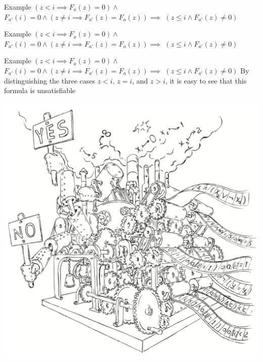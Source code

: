 \documentclass{beamer}
\begin{document}
\begin{frame}{Example}
$(z < i \implies F_a(z) = 0) \wedge$\newline
$F_{a'}(i) = 0 \wedge (z \ne i \implies F_{a'}(z) = F_a(z))\implies$\newline
$(z \le i \wedge F_{a'}(z) \ne 0)$
\end{frame}

\begin{frame}{Example}
$(z < i \implies F_a(z) = 0) \wedge$\newline
$F_{a'}(i) = 0 \wedge (z \ne i \implies F_{a'}(z) = F_a(z))\implies$\newline
$(z \le i \wedge F_{a'}(z) \ne 0)$\newline
\end{frame}

\begin{frame}{Example}
$(z < i \implies F_a(z) = 0) \wedge$\newline
$F_{a'}(i) = 0 \wedge (z \ne i \implies F_{a'}(z) = F_a(z))\implies$\newline
$(z \le i \wedge F_{a'}(z) \ne 0)$\newline
By distinguishing the three cases $z < i$, $z = i$, and $z > i$, it is easy to see that this formula is unsatisfiable
\end{frame}

\begin{frame}
\includegraphics[scale=0.5]{../decision-procedure.png}
\end{frame}
\end{document}
